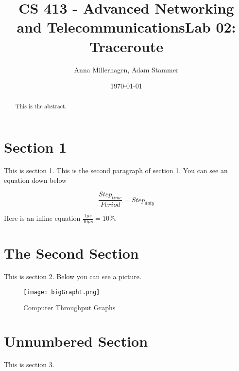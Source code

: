 \documentclass[prb,preprint]{revtex4-1}
\begin{document}
\title{CS 413 - Advanced Networking and Telecommunications\newline Lab 02: Traceroute}
\author{Anna Millerhagen, Adam Stammer}

\date{\today}

\begin{abstract}
This is the abstract.
\end{abstract}

\maketitle




\section{Section 1}
This is section 1.
\newline
This is the second paragraph of section 1. You can see an equation down below

\begin{equation}
\frac{Step_{time}}{Period} = Step_{duty}
\end{equation}



Here is an inline equation $\frac{1\mu s}{10\mu s} = 10\%$.

\section{The Second Section}
This is section 2. Below you can see a picture. 

\begin{figure}[ht]
	\centering
	\texttt{[image: bigGraph1.png]}
	\caption{Computer Throughput Graphs}
	\label{fig1}
\end{figure}

\section*{Unnumbered Section}
This is section 3.

\end{document}
